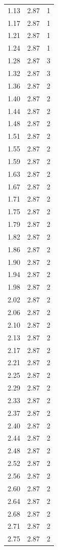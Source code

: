 \begin{longtable}{lrr}
  1.13 & 2.87 & 1 \\
  1.17 & 2.87 & 1 \\
  1.21 & 2.87 & 1 \\
  1.24 & 2.87 & 1 \\
  1.28 & 2.87 & 3 \\
  1.32 & 2.87 & 3 \\
  1.36 & 2.87 & 2 \\
  1.40 & 2.87 & 2 \\
  1.44 & 2.87 & 2 \\
  1.48 & 2.87 & 2 \\
  1.51 & 2.87 & 2 \\
  1.55 & 2.87 & 2 \\
  1.59 & 2.87 & 2 \\
  1.63 & 2.87 & 2 \\
  1.67 & 2.87 & 2 \\
  1.71 & 2.87 & 2 \\
  1.75 & 2.87 & 2 \\
  1.79 & 2.87 & 2 \\
  1.82 & 2.87 & 2 \\
  1.86 & 2.87 & 2 \\
  1.90 & 2.87 & 2 \\
  1.94 & 2.87 & 2 \\
  1.98 & 2.87 & 2 \\
  2.02 & 2.87 & 2 \\
  2.06 & 2.87 & 2 \\
  2.10 & 2.87 & 2 \\
  2.13 & 2.87 & 2 \\
  2.17 & 2.87 & 2 \\
  2.21 & 2.87 & 2 \\
  2.25 & 2.87 & 2 \\
  2.29 & 2.87 & 2 \\
  2.33 & 2.87 & 2 \\
  2.37 & 2.87 & 2 \\
  2.40 & 2.87 & 2 \\
  2.44 & 2.87 & 2 \\
  2.48 & 2.87 & 2 \\
  2.52 & 2.87 & 2 \\
  2.56 & 2.87 & 2 \\
  2.60 & 2.87 & 2 \\
  2.64 & 2.87 & 2 \\
  2.68 & 2.87 & 2 \\
  2.71 & 2.87 & 2 \\
  2.75 & 2.87 & 2 \\

\end{longtable}
